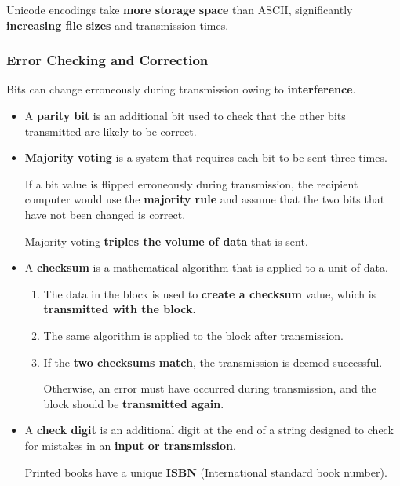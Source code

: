 Unicode encodings take \textbf{more storage space} than ASCII, significantly \textbf{increasing file sizes} and transmission times.

\subsubsection*{Error Checking and Correction}

Bits can change erroneously during transmission owing to \textbf{interference}.
\begin{itemize}
    \item A \textbf{parity bit} is an additional bit used to check that the other bits transmitted are likely to be correct.
    \item \textbf{Majority voting} is a system that requires each bit to be sent three times.

        If a bit value is flipped erroneously during transmission, the recipient computer would use the \textbf{majority rule} and assume that the two bits that have not been changed is correct.

        Majority voting \textbf{triples the volume of data} that is sent.
    \item A \textbf{checksum} is a mathematical algorithm that is applied to a unit of data.
        \begin{enumerate}
            \item The data in the block is used to \textbf{create a checksum} value, which is \textbf{transmitted with the block}.
            \item The same algorithm is applied to the block after transmission.
            \item If the \textbf{two checksums match}, the transmission is deemed successful.

                Otherwise, an error must have occurred during transmission, and the block should be \textbf{transmitted again}.
        \end{enumerate}
    \item A \textbf{check digit} is an additional digit at the end of a string designed to check for mistakes in an \textbf{input or transmission}.

        Printed books have a unique \textbf{ISBN} (International standard book number).
\end{itemize}
